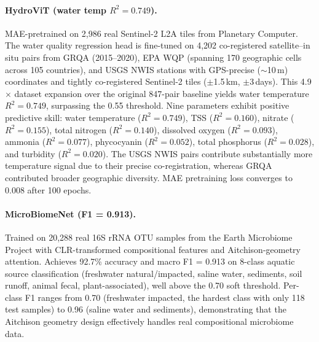 \paragraph{HydroViT (water temp $R^2 = 0.749$).}
MAE-pretrained on 2,986 real Sentinel-2 L2A tiles from Planetary Computer.
The water quality regression head is fine-tuned on 4,202 co-registered
satellite--in situ pairs from GRQA (2015--2020), EPA WQP (spanning
170 geographic cells across 105 countries), and USGS NWIS stations
with GPS-precise ($\sim$10\,m) coordinates and tightly co-registered
Sentinel-2 tiles ($\pm$1.5\,km, $\pm$3\,days).
This 4.9$\times$ dataset expansion over the original 847-pair baseline
yields water temperature $R^2 = 0.749$, surpassing the 0.55 threshold.
Nine parameters exhibit positive predictive skill: water temperature
($R^2 = 0.749$), TSS ($R^2 = 0.160$), nitrate ($R^2 = 0.155$), total
nitrogen ($R^2 = 0.140$), dissolved oxygen ($R^2 = 0.093$), ammonia
($R^2 = 0.077$), phycocyanin ($R^2 = 0.052$), total phosphorus
($R^2 = 0.028$), and turbidity ($R^2 = 0.020$). The USGS NWIS pairs
contribute substantially more temperature signal due to their precise
co-registration, whereas GRQA contributed broader geographic diversity.
MAE pretraining loss converges to 0.008 after 100 epochs.

\paragraph{MicroBiomeNet (F1 = 0.913).}
Trained on 20,288 real 16S rRNA OTU samples from the Earth Microbiome
Project with CLR-transformed compositional features and Aitchison-geometry
attention. Achieves 92.7\% accuracy and macro F1 = 0.913 on 8-class
aquatic source classification (freshwater natural/impacted, saline water,
sediments, soil runoff, animal fecal, plant-associated), well above the
0.70 soft threshold. Per-class F1 ranges from 0.70 (freshwater impacted,
the hardest class with only 118 test samples) to 0.96 (saline water and
sediments), demonstrating that the Aitchison geometry design effectively
handles real compositional microbiome data.

